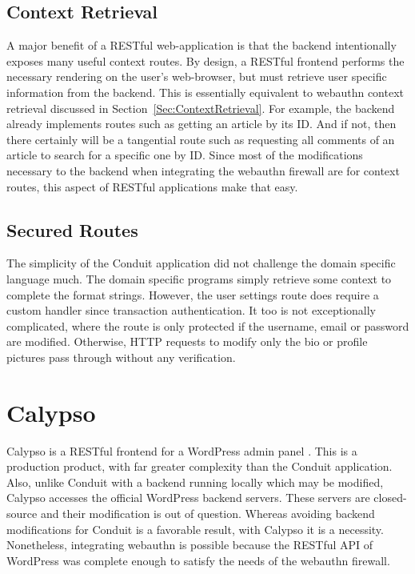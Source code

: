 \subsection{Context Retrieval}\label{Sec:Conduit_ContextRetrieval}

A major benefit of a RESTful web-application is that the backend intentionally exposes many useful context routes. By design, a RESTful frontend performs the necessary rendering on the user's web-browser, but must retrieve user specific information from the backend. This is essentially equivalent to webauthn context retrieval discussed in Section~\ref{Sec:ContextRetrieval}. For example, the backend already implements routes such as getting an article by its ID. And if not, then there certainly will be a tangential route such as requesting all comments of an article to search for a specific one by ID. Since most of the modifications necessary to the backend when integrating the webauthn firewall are for context routes, this aspect of RESTful applications make that easy.

\subsection{Secured Routes}

The simplicity of the Conduit application did not challenge the domain specific language much. The domain specific programs simply retrieve some context to complete the format strings. However, the user settings route does require a custom handler since transaction authentication. It too is not exceptionally complicated, where the route is only protected if the username, email or password are modified. Otherwise, HTTP requests to modify only the bio or profile pictures pass through without any verification.

\section{Calypso}

Calypso is a RESTful frontend for a WordPress admin panel \cite{TODO-calypso}. This is a production product, with far greater complexity than the Conduit application. Also, unlike Conduit with a backend running locally which may be modified, Calypso accesses the official WordPress backend servers. These servers are closed-source and their modification is out of question. Whereas avoiding backend modifications for Conduit is a favorable result, with Calypso it is a necessity. Nonetheless, integrating webauthn is possible because the RESTful API of WordPress was complete enough to satisfy the needs of the webauthn firewall.

